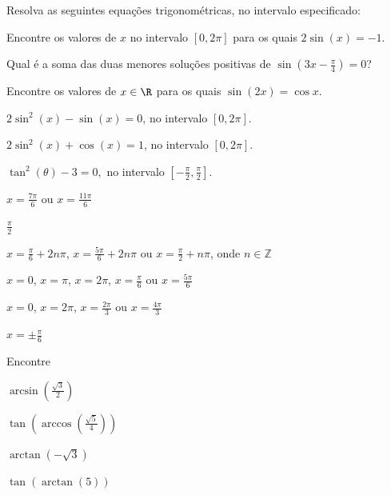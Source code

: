 \begin{exercises*}
\begin{exercise}
  Resolva as seguintes equações trigonométricas, no intervalo
  especificado:
  \begin{alphalist}
    \item Encontre os valores de $x$ no intervalo $[0,2\pi]$ para os quais
          $2\sin(x)=-1$.
    \item Qual é a soma das duas menores soluções positivas de
          $\sin\left(3x-\frac{\pi}{4}\right)=0$?
    \item Encontre os valores de $x\in\R$ para os quais $\sin(2x)=\cos x$.
    \item $2 \sin^2(x)- \sin(x)=0$, no intervalo $[0,2\pi]$.
    \item $2\sin^2(x)+\cos(x)=1$, no intervalo $[0,2\pi]$.
    \item $\tan^2(\theta) -3 = 0,$ no intervalo
          $[-\frac{\pi}{2},\frac{\pi}{2}]$.
  \end{alphalist}

  \begin{answer}
    \begin{alphalist}
      \item $x=\frac{7\pi}{6}$ ou $x=\frac{11\pi}{6}$
      \item $\frac{\pi}{2}$
      \item $x=\frac{\pi}{6}+2n\pi$, $x=\frac{5\pi}{6}+2n\pi$ ou
            $x=\frac{\pi}{2}+n\pi$,  onde $n\in\mathbb{Z}$
      \item $x=0$, $x=\pi$, $x=2\pi$, $x = \frac{\pi}{6}$ ou  $x =
            \frac{5\pi}{6}$
      \item $x=0$, $x= 2\pi$, $x=\frac{2\pi}{3}$ ou $x=\frac{4\pi}{3}$
      \item $x = \pm\frac{\pi}{6}$
    \end{alphalist}
  \end{answer}
\end{exercise}

\begin{exercise}
  Encontre
  \begin{alphalist}
    \item $\arcsin(\frac{\sqrt{3}}{2})$
    \item $\tan(\arccos(\frac{\sqrt{5}}{4}))$
    \item $\arctan(-\sqrt{3})$
    \item $\tan(\arctan(5))$
  \end{alphalist}


\end{exercise}
\end{exercises*}
